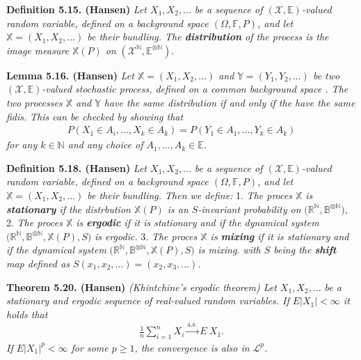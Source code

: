\documentclass[a4paper,10pt,openany]{book}
\begin{document}
\textbf{Definition 5.15. (Hansen)} \emph{Let \(X_1,X_2,...\) be a sequence of \((\mathcal{X},\mathbb{E})\)-valued random variable, defined on a background space \((\Omega,\mathbb{F},P)\), and let \(\mathbb{X}=(X_1,X_2,...)\) be their bundling. The \textbf{distribution} of the process is the image measure \(\mathbb{X}(P)\) on} \((\mathcal{X}^{\mathbb{N}},{\mathbb{E}}^{\otimes \mathbb{N}})\).

\textbf{Lemma 5.16. (Hansen)} \emph{Let \(\mathbb{X}=(X_1,X_2,...)\) and \(\mathbb{Y}=(Y_1,Y_2,...)\) be two \((\mathcal{X},\mathbb{E})\)-valued stochastic process, defined on a common background space . The two processes \(\mathbb{X}\) and \(\mathbb{Y}\) have the same distribution if and only if the have the same fidis.}
\emph{This can be checked by showing that}
\begin{align*}
    P(X_1\in A_i,...,X_k\in A_k)=P(Y_1\in A_1,...,Y_k\in A_k)\tag{5.25}
\end{align*}
\emph{for any \(k\in\mathbb{N}\) and any choice of \(A_1,...,A_k\in\mathbb{E}\).}

\textbf{Definition 5.18. (Hansen)} \emph{Let \(X_1,X_2,...\) be a sequence of \((\mathcal{X},\mathbb{E})\)-valued random variable, defined on a background space \((\Omega,\mathbb{F},P)\), and let \(\mathbb{X}=(X_1,X_2,...)\) be their bundling. Then we define:}
1. \emph{The proces \(\mathbb{X}\) is \textbf{stationary} if the distrbution \(\mathbb{X}(P)\) is an \(S\)-invariant probability on} \(\Big(\mathbb{R}^{\mathbb{N}},\mathbb{B}^{\otimes \mathbb{N}}\Big)\),
2. \emph{The proces \(\mathbb{X}\) is \textbf{ergodic} if it is stationary and if the dynamical system} \(\Big(\mathbb{R}^{\mathbb{N}},\mathbb{B}^{\otimes \mathbb{N}},\mathbb{X}(P),S\Big)\) \emph{is ergodic.}
3. \emph{The proces \(\mathbb{X}\) is \textbf{mixing} if it is stationary and if the dynamical system} \(\Big(\mathbb{R}^{\mathbb{N}},\mathbb{B}^{\otimes \mathbb{N}},\mathbb{X}(P),S\Big)\) \emph{is mixing.}
\emph{with \(S\) being the \textbf{shift} map defined as \(S(x_1,x_2,...)=(x_2,x_3,...)\).}

\textbf{Theorem 5.20. (Hansen)} \emph{(Khintchine's ergodic theorem) Let \(X_1,X_2,...\) be a stationary and ergodic sequence of real-valued random variables. If \(E\vert X_1\vert <\infty\) it holds that}
\begin{align*}
    \frac{1}{n}\sum_{i=1}^nX_i\stackrel{\text{a.s.}}{\to} E\ X_1.\tag{5.27}
\end{align*}
\emph{If \(E\vert X_1\vert ^p<\infty\) for some \(p\ge 1\), the convergence is also in \(\mathcal{L}^p\).}
\end{document}

